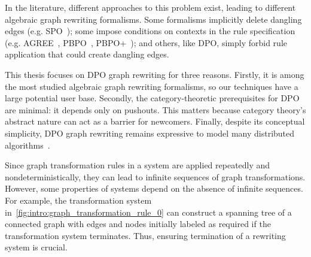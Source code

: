 In the literature, different approaches to this problem exist, leading to different algebraic graph rewriting formalisms. Some formalisms implicitly delete dangling edges (e.g. SPO~\cite{ehrig1997algebraic}); 
some impose conditions on contexts in the rule specification (e.g. AGREE~\cite{corradini2015agree}, PBPO~\cite{corradini2019thepbpo}, PBPO+~\cite{overbeek2023graph}); and others, like DPO, simply forbid rule application that could create dangling edges.

   This thesis focuses on DPO graph rewriting for three reasons.
   Firstly, it is among the most studied algebraic graph rewriting formalisms, so our techniques have a large potential user base.
   Secondly, the category-theoretic prerequisites for DPO are minimal: it depends only on pushouts. This matters because category theory's abstract nature can act as a barrier for newcomers.
    Finally, despite its conceptual simplicity, DPO graph rewriting remains expressive to model many distributed algorithms~\cite{ehrig2006fundamentals,corradini1997algebraic}.
    
Since graph transformation rules in a system are applied repeatedly and nondeterministically, they can lead to infinite sequences of graph transformations. However, some properties of systems depend on the absence of infinite sequences. For example, the transformation system in~\autoref{fig:intro:graph_transformation_rule_0} can construct a spanning tree of a connected graph with edges and nodes initially labeled as required if the transformation system terminates. Thus, ensuring termination of a rewriting system is crucial.

